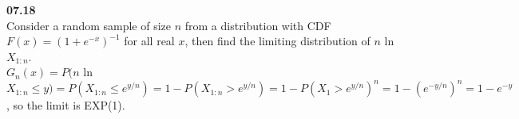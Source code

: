

{\bf 07.18}\\

Consider a random sample of size $n$ from a distribution with CDF $F(x)=(1+e^{-x})^{-1}$ for all real $x$, then find the limiting distribution of $n$ ln$X_{1:n}$.\\
${ G }_{ n }(x)=P(n$ ln$X_{1:n}\le y) = P(X_{1:n}\le e^{y/n}) = 1 - P(X_{1:n} > e^{y/n})=1 - P(X_{1} > e^{y/n})^{n} = 1 - (e^{-y/n})^{n} = 1 - e^{-y}$, so the limit is EXP(1).\\

